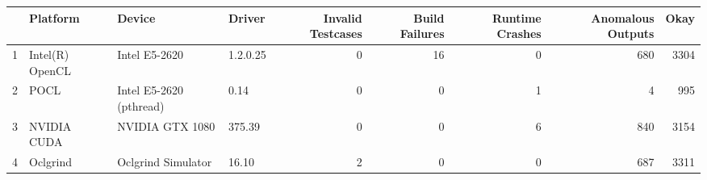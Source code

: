 \begin{tabular}{llllrrrrr}
\toprule
{} &         Platform &                   Device &    Driver &  Invalid Testcases &  Build Failures &  Runtime Crashes &  Anomalous  Outputs &  Okay \\
\midrule
1 &  Intel(R) OpenCL &            Intel E5-2620 &  1.2.0.25 &                  0 &              16 &                0 &                 680 &  3304 \\
2 &             POCL &  Intel E5-2620 (pthread) &      0.14 &                  0 &               0 &                1 &                   4 &   995 \\
3 &      NVIDIA CUDA &          NVIDIA GTX 1080 &    375.39 &                  0 &               0 &                6 &                 840 &  3154 \\
4 &         Oclgrind &       Oclgrind Simulator &     16.10 &                  2 &               0 &                0 &                 687 &  3311 \\
\bottomrule
\end{tabular}
